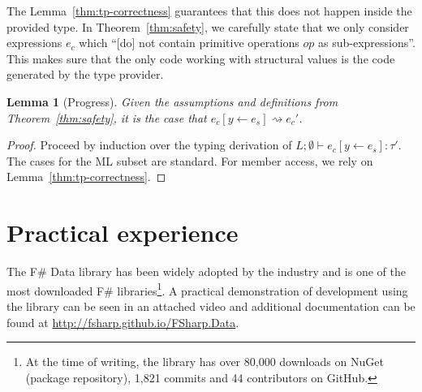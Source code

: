 \documentclass[10pt,preprint,blind,clearpagebib]{sigplanconf}
\newcommand{\reduce}{\rightsquigarrow}
\newtheorem{lemma}[theorem]{Lemma}
\begin{document}
The Lemma~\ref{thm:tp-correctness} guarantees that this does not happen inside the provided type.
In Theorem~\ref{thm:safety}, we carefully state that we only consider expressions $e_c$ which 
``[do] not contain primitive operations $op$ as sub-expressions''. This makes sure that the only 
code working with structural values is the code generated by the type provider.

\begin{lemma}[Progress]
\label{thm:rs-progress}
Given the assumptions and definitions from Theorem~\ref{thm:safety}, it is the case that
$e_c[y\leftarrow e_s] \reduce e_c'$.
\end{lemma}
\begin{proof}
Proceed by induction over the typing derivation of $L; \emptyset \vdash e_c[y\leftarrow e_s] : \tau'$. 
The cases for the ML subset are standard. For member access, we rely on Lemma~\ref{thm:tp-correctness}.
\end{proof}



%
%

\section{Practical experience}
\label{sec:impl}

The F\# Data library has been widely adopted by the industry and is one of the most downloaded
F\# libraries\footnote{At the time of writing, the library has over 80,000 downloads on NuGet 
(package repository), 1,821 commits and 44 contributors on GitHub.}. A practical demonstration of 
development using the library can be seen in an attached video and additional documentation can be
found at \url{http://fsharp.github.io/FSharp.Data}.
\end{document}
